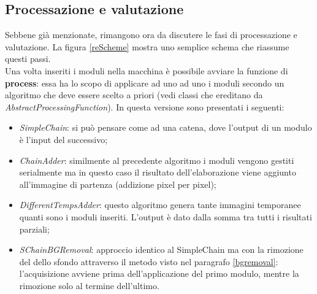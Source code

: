 \documentclass[a4paper,10pt, twocolumn]{article}
\begin{document}
 \subsection{Processazione e valutazione}
 Sebbene gi\`{a} menzionate, rimangono ora da discutere le fasi di processazione e valutazione.
 La figura \ref{reScheme} mostra uno semplice schema che riassume questi passi.\\
 Una volta inseriti i moduli nella macchina \`{e} possibile avviare la funzione di 
 \textbf{process}: essa ha lo scopo di applicare ad uno ad uno i moduli secondo un algoritmo 
 che deve essere scelto a priori (vedi classi che ereditano da
  \textit{AbstractProcessingFunction}). 
  In questa versione sono presentati i seguenti:
 \begin{itemize}
  \item \textit{SimpleChain}: si pu\`{o} pensare come ad una catena, dove l'output 
  di un modulo \`{e} l'input del successivo;
  \item \textit{ChainAdder}: similmente al precedente algoritmo i moduli vengono gestiti
  serialmente ma in questo caso il risultato dell'elaborazione viene aggiunto all'immagine
  di partenza (addizione pixel per pixel);
  \item \textit{DifferentTempsAdder}: questo algoritmo genera tante immagini temporanee 
  quanti sono i moduli inseriti. L'output \`{e} dato dalla somma tra tutti i risultati
  parziali;
  \item \textit{SChainBGRemoval}: approccio identico al SimpleChain ma con la rimozione 
  del dello sfondo attraverso il metodo visto nel paragrafo \ref{bgremoval}:
  l'acquisizione avviene prima dell'applicazione del primo modulo, mentre la rimozione
  solo al termine dell'ultimo.
 \end{itemize}
\end{document}
